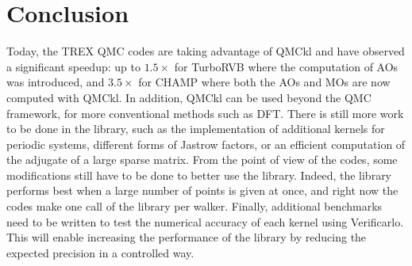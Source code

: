 \section{Conclusion}

Today, the TREX QMC codes are taking advantage of QMCkl and have
observed a significant speedup: up to $1.5\times$ for TurboRVB where the computation of AOs was introduced, and $3.5\times$ for CHAMP where both the AOs and MOs are now computed with QMCkl.
In addition, QMCkl can be used beyond the QMC framework,
for more conventional methods such as \ac{DFT}. There is still more work to be
done in the library, such as the implementation of additional kernels for
periodic systems, different forms of Jastrow factors, or an efficient computation of the
adjugate of a large sparse matrix.
From the point of view of the codes, some modifications still have to be done to better use
the library. Indeed, the library performs best when a large number of points is given at once, and right now the codes make one call of the library per walker.
Finally, additional benchmarks need to be written to test the numerical accuracy of each kernel using Verificarlo.
This will enable increasing the performance of the library by reducing the expected precision in a controlled way.
